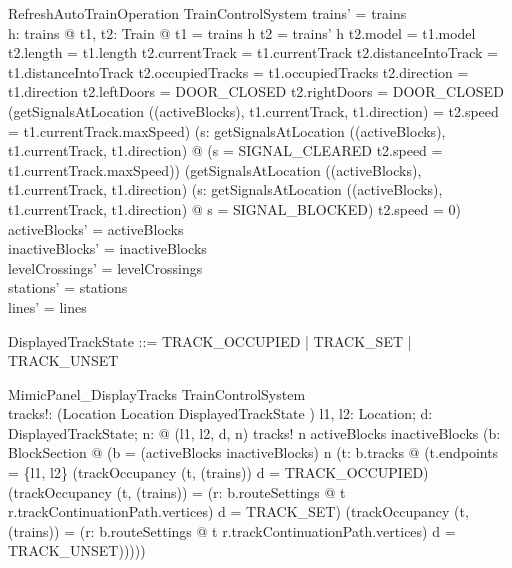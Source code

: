 \begin{schema}{RefreshAutoTrainOperation}
  \Delta TrainControlSystem
\where
  \dom  trains' = \dom  trains\\
  \forall  h: \dom  trains @ \exists  t1, t2: Train @ t1 = trains h \land  t2 = trains' h \land  t2.model = t1.model \land  t2.length = t1.length \land  t2.currentTrack = t1.currentTrack \land  t2.distanceIntoTrack = t1.distanceIntoTrack \land  t2.occupiedTracks = t1.occupiedTracks \land  t2.direction = t1.direction \land  t2.leftDoors = DOOR\_CLOSED \land  t2.rightDoors = DOOR\_CLOSED \land  (getSignalsAtLocation ((\ran  activeBlocks), t1.currentTrack, t1.direction) = \emptyset \implies  t2.speed = t1.currentTrack.maxSpeed) \land  (\exists  s: getSignalsAtLocation ((\ran  activeBlocks), t1.currentTrack, t1.direction) @ (s = SIGNAL\_CLEARED \implies  t2.speed = t1.currentTrack.maxSpeed)) \land  (getSignalsAtLocation ((\ran  activeBlocks), t1.currentTrack, t1.direction) \neq  \emptyset \land  (\forall  s: getSignalsAtLocation ((\ran  activeBlocks), t1.currentTrack, t1.direction) @ s = SIGNAL\_BLOCKED) \implies  t2.speed = 0)\\
  activeBlocks' = activeBlocks\\
  inactiveBlocks' = inactiveBlocks\\
  levelCrossings' = levelCrossings\\
  stations' = stations\\
  lines' = lines
\end{schema}

\begin{zed}
DisplayedTrackState ::= TRACK\_OCCUPIED | TRACK\_SET | TRACK\_UNSET
\end{zed}

\begin{schema}{MimicPanel\_DisplayTracks}
  \Xi TrainControlSystem\\
  tracks!: \finset  (Location \cross  Location \cross  DisplayedTrackState \cross  \nat )
\where
  \forall  l1, l2: Location; d: DisplayedTrackState; n: \nat  @ (l1, l2, d, n) \in  tracks! \iff  n \in  \dom  activeBlocks \cup  \dom  inactiveBlocks \land  (\exists  b: BlockSection @ (b = (activeBlocks \cup  inactiveBlocks) n \land  (\exists  t: b.tracks @ (t.endpoints = \{l1, l2\} \land  (trackOccupancy (t, (\ran  trains)) \neq  \emptyset \implies  d = TRACK\_OCCUPIED) \land  (trackOccupancy (t, (\ran  trains)) = \emptyset \land  (\exists  r: b.routeSettings @ t \in  \ran  r.trackContinuationPath.vertices) \implies  d = TRACK\_SET) \land  (trackOccupancy (t, (\ran  trains)) = \emptyset \land  (\forall  r: b.routeSettings @ t \notin  \ran  r.trackContinuationPath.vertices) \implies  d = TRACK\_UNSET)))))
\end{schema}

